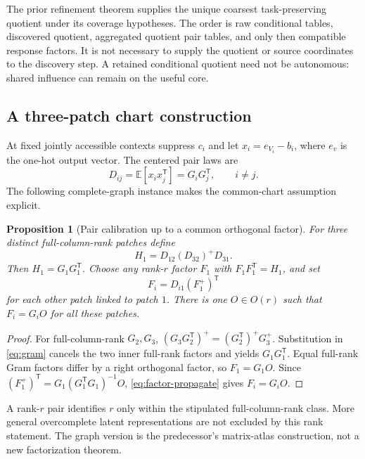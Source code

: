 \documentclass[11pt]{article}
\newtheorem{proposition}[theorem]{Proposition}
\theoremstyle{definition}
\theoremstyle{remark}
\newcommand{\E}{\mathbb E}
\newcommand{\trans}{\mathsf T}
\begin{document}
The prior refinement theorem supplies the unique coarsest task-preserving
quotient under its coverage hypotheses. The order is raw conditional
tables, discovered quotient, aggregated quotient pair tables, and only
then compatible response factors. It is not necessary to supply the
quotient or source coordinates to the discovery step. A retained
conditional quotient need not be autonomous: shared influence can remain
on the useful core.

\subsection{A three-patch chart construction}

At fixed jointly accessible contexts suppress $c_i$ and let
$x_i=e_{V_i}-b_i$, where $e_v$ is the one-hot output vector. The centered
pair laws are
\begin{equation}
D_{ij}=\E[x_ix_j^\trans]=G_iG_j^\trans,\qquad i\ne j.
\label{eq:pair}
\end{equation}
The following complete-graph instance makes the common-chart assumption
explicit.

\begin{proposition}[Pair calibration up to a common orthogonal factor]
\label{prop:chart}
For three distinct full-column-rank patches define
\begin{equation}
H_1=D_{12}(D_{32})^+D_{31}.
\label{eq:gram}
\end{equation}
Then $H_1=G_1G_1^\trans$. Choose any rank-$r$ factor $F_1$ with
$F_1F_1^\trans=H_1$, and set
\begin{equation}
F_i=D_{i1}(F_1^+)^\trans
\label{eq:factor-propagate}
\end{equation}
for each other patch linked to patch $1$. There is one $O\in O(r)$ such
that $F_i=G_iO$ for all these patches.
\end{proposition}
\begin{proof}
For full-column-rank $G_2,G_3$,
$(G_3G_2^\trans)^+=(G_2^\trans)^+G_3^+$.
Substitution in \eqref{eq:gram} cancels the two inner full-rank factors
and yields $G_1G_1^\trans$. Equal full-rank Gram factors differ by a right
orthogonal factor, so $F_1=G_1O$. Since
$(F_1^+)^\trans=G_1(G_1^\trans G_1)^{-1}O$,
\eqref{eq:factor-propagate} gives $F_i=G_iO$.
\end{proof}

A rank-$r$ pair identifies $r$ only within the stipulated
full-column-rank class. More general overcomplete latent representations
are not excluded by this rank statement. The graph version is the
predecessor's matrix-atlas construction, not a new factorization theorem.
\end{document}
